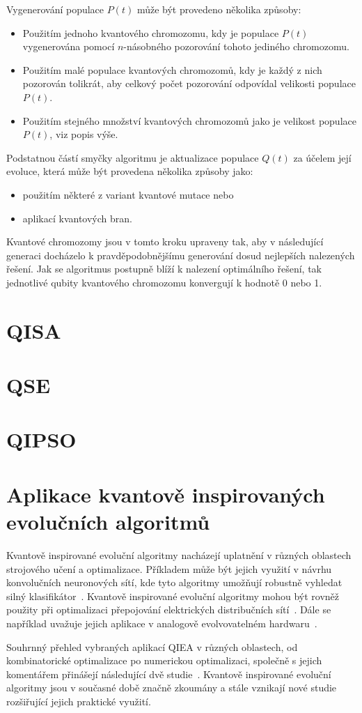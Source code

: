 Vygenerování populace $P(t)$ může být provedeno několika způsoby:
\begin{itemize}
    \item Použitím jednoho kvantového chromozomu, kdy je populace $P(t)$ vygenerována pomocí $n$-násobného pozorování tohoto jediného chromozomu. 
    \item Použitím malé populace kvantových chromozomů, kdy je každý z nich pozorován tolikrát, aby celkový počet pozorování odpovídal velikosti populace $P(t)$.
    \item Použitím stejného množství kvantových chromozomů jako je velikost populace $P(t)$, viz popis výše.
\end{itemize}

Podstatnou částí smyčky algoritmu je aktualizace populace $Q(t)$ za účelem její evoluce, která může být provedena několika způsoby jako:
\begin{itemize}
    \item použitím některé z variant kvantové mutace nebo
    \item aplikací kvantových bran.
\end{itemize}
Kvantové chromozomy jsou v tomto kroku upraveny tak, aby v následující generaci docházelo k pravděpodobnějšímu generování dosud nejlepších nalezených řešení. 
Jak se algoritmus postupně blíží k nalezení optimálního řešení, tak jednotlivé qubity kvantového chromozomu konvergují k hodnotě 0 nebo 1.

\section{QISA}

\section{QSE}

\section{QIPSO}

\section{Aplikace kvantově inspirovaných evolučních algoritmů}
Kvantově inspirované evoluční algoritmy nacházejí uplatnění v různých oblastech strojového učení a optimalizace. 
Příkladem může být jejich využití v návrhu konvolučních neuronových sítí, kde tyto algoritmy umožňují robustně vyhledat silný klasifikátor~\cite{QIEA-CNN}. 
Kvantově inspirované evoluční algoritmy mohou být rovněž použity při optimalizaci přepojování elektrických distribučních sítí~\cite{QIEA-net}. 
Dále se například uvažuje jejich aplikace v analogově evolvovatelném hardwaru~\cite{QIEA-EHW}. 

Souhrnný přehled vybraných aplikací QIEA v různých oblastech, od kombinatorické optimalizace po numerickou optimalizaci, společně s jejich komentářem přinášejí následující dvě studie~\cite{QIEA-survey1, QIEA-survey2}. 
Kvantově inspirované evoluční algoritmy jsou v současné době značně zkoumány a stále vznikají nové studie rozšiřující jejich praktické využití. 
